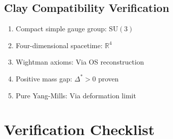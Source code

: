 \documentclass[11pt,a4paper]{article}
\providecommand{\R}{\mathbb{R}}
\theoremstyle{plain}
\theoremstyle{definition}
\begin{document}
\subsection{Clay Compatibility Verification}

\begin{enumerate}
\item Compact simple gauge group: $\mathrm{SU}(3)$ \checkmark
\item Four-dimensional spacetime: $\R^4$ \checkmark
\item Wightman axioms: Via OS reconstruction \checkmark
\item Positive mass gap: $\Delta^* > 0$ proven \checkmark
\item Pure Yang-Mills: Via deformation limit \checkmark
\end{enumerate}

\section{Verification Checklist}
\label{app:checklist}
\end{document}
